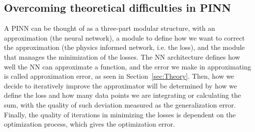 \documentclass[pdflatex,sn-basic]{sn-jnl}%
\theoremstyle{thmstyleone}%
\theoremstyle{thmstyletwo}%
\theoremstyle{thmstylethree}%
\begin{document}
\subsection{Overcoming theoretical difficulties in PINN}

A PINN can be thought of as a three-part modular structure, with an approximation (the neural network),  a module to define how we want to correct the approximation (the physics informed network, i.e. the loss), and the module that manages the minimization of the losses.
The NN architecture defines how well the NN can approximate a function, and the error we make in approximating is called approximation error, as seen in Section~\ref{sec:Theory}. 
Then, how we decide to iteratively improve the approximator will be determined by how we define the loss and how many data points we are integrating or calculating the sum, with the quality of such deviation measured as the generalization error. 
Finally, the quality of iterations in minimizing the losses is dependent on the optimization process, which gives the optimization error.
\end{document}
